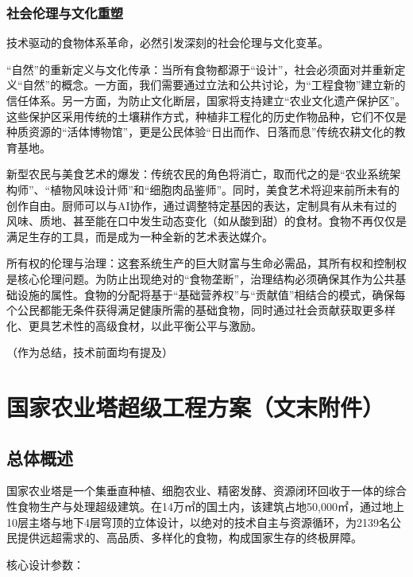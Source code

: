 \subsection{社会伦理与文化重塑}\label{ux793eux4f1aux4f26ux7406ux4e0eux6587ux5316ux91cdux5851}

技术驱动的食物体系革命，必然引发深刻的社会伦理与文化变革。

``自然''的重新定义与文化传承：当所有食物都源于``设计''，社会必须面对并重新定义``自然''的概念。一方面，我们需要通过立法和公共讨论，为``工程食物''建立新的信任体系。另一方面，为防止文化断层，国家将支持建立``农业文化遗产保护区''。这些保护区采用传统的土壤耕作方式，种植非工程化的历史作物品种，它们不仅是种质资源的``活体博物馆''，更是公民体验``日出而作、日落而息''传统农耕文化的教育基地。

新型农民与美食艺术的爆发：传统农民的角色将消亡，取而代之的是``农业系统架构师''、``植物风味设计师''和``细胞肉品鉴师''。同时，美食艺术将迎来前所未有的创作自由。厨师可以与AI协作，通过调整特定基因的表达，定制具有从未有过的风味、质地、甚至能在口中发生动态变化（如从酸到甜）的食材。食物不再仅仅是满足生存的工具，而是成为一种全新的艺术表达媒介。

所有权的伦理与治理：这套系统生产的巨大财富与生命必需品，其所有权和控制权是核心伦理问题。为防止出现绝对的``食物垄断''，治理结构必须确保其作为公共基础设施的属性。食物的分配将基于``基础营养权''与``贡献值''相结合的模式，确保每个公民都能无条件获得满足健康所需的基础食物，同时通过社会贡献获取更多样化、更具艺术性的高级食材，以此平衡公平与激励。

（作为总结，技术前面均有提及）

\chapter{国家农业塔超级工程方案（文末附件）}\label{ux56fdux5bb6ux519cux4e1aux5854ux8d85ux7ea7ux5de5ux7a0bux65b9ux6848ux6587ux672bux9644ux4ef6}

\section{总体概述}\label{ux603bux4f53ux6982ux8ff0}

国家农业塔是一个集垂直种植、细胞农业、精密发酵、资源闭环回收于一体的综合性食物生产与处理超级建筑。在14万㎡的国土内，该建筑占地50,000㎡，通过地上10层主塔与地下4层穹顶的立体设计，以绝对的技术自主与资源循环，为2139名公民提供远超需求的、高品质、多样化的食物，构成国家生存的终极屏障。

核心设计参数：

